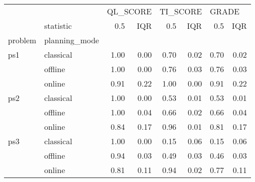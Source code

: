 \begin{tabular}{llrrrrrr}
\toprule
    & {} & \multicolumn{2}{l}{QL\_SCORE} & \multicolumn{2}{l}{TI\_SCORE} & \multicolumn{2}{l}{GRADE} \\
    & statistic &      0.5 &  IQR &      0.5 &  IQR &   0.5 &  IQR \\
problem & planning\_mode &          &      &          &      &       &      \\
\midrule
ps1 & classical &     1.00 & 0.00 &     0.70 & 0.02 &  0.70 & 0.02 \\
    & offline &     1.00 & 0.00 &     0.76 & 0.03 &  0.76 & 0.03 \\
    & online &     0.91 & 0.22 &     1.00 & 0.00 &  0.91 & 0.22 \\
ps2 & classical &     1.00 & 0.00 &     0.53 & 0.01 &  0.53 & 0.01 \\
    & offline &     1.00 & 0.04 &     0.66 & 0.02 &  0.66 & 0.04 \\
    & online &     0.84 & 0.17 &     0.96 & 0.01 &  0.81 & 0.17 \\
ps3 & classical &     1.00 & 0.00 &     0.15 & 0.06 &  0.15 & 0.06 \\
    & offline &     0.94 & 0.03 &     0.49 & 0.03 &  0.46 & 0.03 \\
    & online &     0.81 & 0.11 &     0.94 & 0.02 &  0.77 & 0.11 \\
\bottomrule
\end{tabular}
